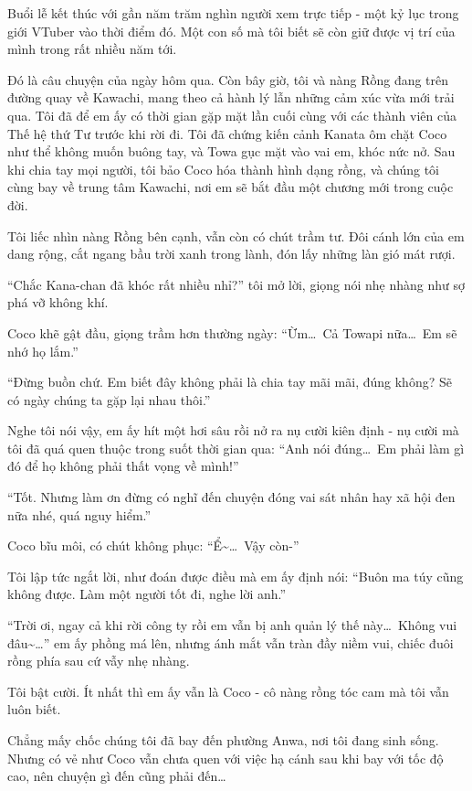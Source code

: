 \documentclass[../main.tex]{subfiles}
\begin{document}
Buổi lễ kết thúc với gần năm trăm nghìn người xem trực tiếp - một kỷ lục trong giới VTuber vào thời điểm đó. Một con số mà tôi biết sẽ còn giữ được vị trí của mình trong rất nhiều năm tới.

\ct

Đó là câu chuyện của ngày hôm qua. Còn bây giờ, tôi và nàng Rồng đang trên đường quay về Kawachi, mang theo cả hành lý lẫn những cảm xúc vừa mới trải qua. Tôi đã để em ấy có thời gian gặp mặt lần cuối cùng với các thành viên của Thế hệ thứ Tư trước khi rời đi. Tôi đã chứng kiến cảnh Kanata ôm chặt Coco như thể không muốn buông tay, và Towa gục mặt vào vai em, khóc nức nở. Sau khi chia tay mọi người, tôi bảo Coco hóa thành hình dạng rồng, và chúng tôi cùng bay về trung tâm Kawachi, nơi em sẽ bắt đầu một chương mới trong cuộc đời.

Tôi liếc nhìn nàng Rồng bên cạnh, vẫn còn có chút trầm tư. Đôi cánh lớn của em dang rộng, cắt ngang bầu trời xanh trong lành, đón lấy những làn gió mát rượi.

``Chắc Kana-chan đã khóc rất nhiều nhỉ?'' tôi mở lời, giọng nói nhẹ nhàng như sợ phá vỡ không khí.

Coco khẽ gật đầu, giọng trầm hơn thường ngày: ``Ừm\dots\ Cả Towapi nữa\dots\ Em sẽ nhớ họ lắm.''

``Đừng buồn chứ. Em biết đây không phải là chia tay mãi mãi, đúng không? Sẽ có ngày chúng ta gặp lại nhau thôi.''

Nghe tôi nói vậy, em ấy hít một hơi sâu rồi nở ra nụ cười kiên định - nụ cười mà tôi đã quá quen thuộc trong suốt thời gian qua: ``Anh nói đúng\dots\ Em phải làm gì đó để họ không phải thất vọng về mình!''

``Tốt. Nhưng làm ơn đừng có nghĩ đến chuyện đóng vai sát nhân hay xã hội đen nữa nhé, quá nguy hiểm.''

Coco bĩu môi, có chút không phục: ``Ể\~{}\dots\ Vậy còn-''

Tôi lập tức ngắt lời, như đoán được điều mà em ấy định nói: ``Buôn ma túy cũng không được. Làm một người tốt đi, nghe lời anh.''

``Trời ơi, ngay cả khi rời công ty rồi em vẫn bị anh quản lý thế này\dots\ Không vui đâu\~{}\dots'' em ấy phồng má lên, nhưng ánh mắt vẫn tràn đầy niềm vui, chiếc đuôi rồng phía sau cứ vẫy nhẹ nhàng.

Tôi bật cười. Ít nhất thì em ấy vẫn là Coco - cô nàng rồng tóc cam mà tôi vẫn luôn biết.

\ct

Chẳng mấy chốc chúng tôi đã bay đến phường Anwa, nơi tôi đang sinh sống. Nhưng có vẻ như Coco vẫn chưa quen với việc hạ cánh sau khi bay với tốc độ cao, nên chuyện gì đến cũng phải đến\dots
\end{document}
